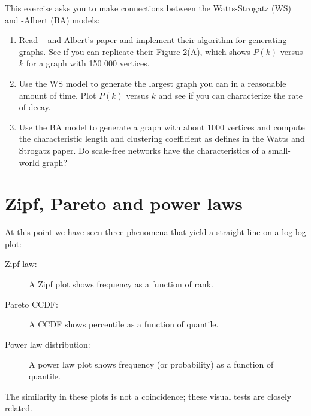 \documentclass[10pt]{book}
\begin{document}
\begin{ex}

This exercise asks you to make connections between the Watts-Strogatz (WS)
and \Barabasi-Albert (BA) models:

\begin{enumerate}

\item Read \Barabasi~ and Albert's paper and implement their algorithm
for generating graphs.  See if you can replicate their Figure 2(A),
which shows $P(k)$ versus $k$ for a graph with 150 000 vertices.

\item Use the WS model to generate the largest graph you can in
a reasonable amount of time.  Plot $P(k)$ versus $k$ and see if
you can characterize the rate of decay.

\item Use the BA model to generate a graph with about 1000 vertices
and compute the characteristic length and clustering coefficient
as defines in the Watts and Strogatz paper.  Do scale-free networks
have the characteristics of a small-world graph?

\end{enumerate}

\end{ex}




\section{Zipf, Pareto and power laws}


At this point we have seen three phenomena that yield a straight line
on a log-log plot:

\begin{description}

\item[Zipf law:] A Zipf plot shows frequency as a function of rank. 

\item[Pareto CCDF:] A CCDF shows percentile as a function of quantile.

\item[Power law distribution:] A power law plot shows frequency
(or probability) as a function of quantile.

\end{description}

The similarity in these plots is not a coincidence; these
visual tests are closely related.
\end{document}
